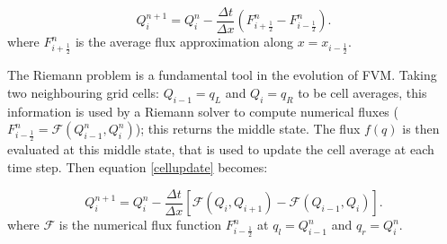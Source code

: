 \documentclass[10pt,a4paper]{article}
\begin{document}
	\begin{equation}
		Q_{i}^{n+1} = Q_{i}^{n} - \frac{\Delta t}{\Delta x} (F_{i+\frac{1}{2}}^{n} - F_{i-\frac{1}{2}}^{n}).
		\label{cellupdate}
	\end{equation}	
	where $F_{i+\frac{1}{2}}^{n} $ is the average flux approximation along $x=x_{i-\frac{1}{2}}$.
	
	The Riemann problem is a fundamental tool in the evolution of FVM. Taking two neighbouring grid cells: $Q_{i-1} = q_{L}$ and $Q_{i} = q_{R}$ to be cell averages, this information is used by a Riemann solver to compute numerical fluxes ( $F_{i-\frac{1}{2}}^{n} = \mathcal{F}(Q_{i-1}^{n} , Q_{i}^{n} )$); this returns the middle state.  The flux $f(q)$ is then evaluated at this middle state, that is used to update the cell average at each time step. Then equation \eqref{cellupdate} becomes:
	
	\begin{equation}
		Q_{i}^{n+1} = Q_{i}^{n} - \frac{\Delta t}{\Delta x} \left[ \mathcal{F}(Q_{i} , Q_{i+1} ) - \mathcal{F}(Q_{i-1} , Q_{i} ) \right].
		\label{cellupdat}
	\end{equation}
	where $\mathcal{F}$ is the  numerical flux function $F_{i-\frac{1}{2}}^{n}$ at $q_l = Q_{i-1}^{n}$  and $q_r = Q_{i}^{n}$.
	
\end{document}
